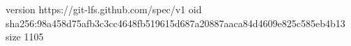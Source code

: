 version https://git-lfs.github.com/spec/v1
oid sha256:98a458d75afb3c3cc4648fb519615d687a20887aaca84d4609e825c585eb4b13
size 1105
